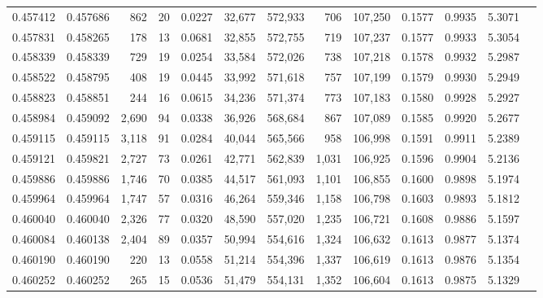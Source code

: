 \begin{tabular}{rrrrrrrrrrrrr}
0.457412 & 0.457686 &   862 &    20 &                                     0.0227 &  32,677 & 572,933 &     706 & 107,250 & 0.1577 & 0.9935 & 5.3071 \\
0.457831 & 0.458265 &   178 &    13 &                                     0.0681 &  32,855 & 572,755 &     719 & 107,237 & 0.1577 & 0.9933 & 5.3054 \\
0.458339 & 0.458339 &   729 &    19 &                                     0.0254 &  33,584 & 572,026 &     738 & 107,218 & 0.1578 & 0.9932 & 5.2987 \\
0.458522 & 0.458795 &   408 &    19 &                                     0.0445 &  33,992 & 571,618 &     757 & 107,199 & 0.1579 & 0.9930 & 5.2949 \\
0.458823 & 0.458851 &   244 &    16 &                                     0.0615 &  34,236 & 571,374 &     773 & 107,183 & 0.1580 & 0.9928 & 5.2927 \\
0.458984 & 0.459092 & 2,690 &    94 &                                     0.0338 &  36,926 & 568,684 &     867 & 107,089 & 0.1585 & 0.9920 & 5.2677 \\
0.459115 & 0.459115 & 3,118 &    91 &                                     0.0284 &  40,044 & 565,566 &     958 & 106,998 & 0.1591 & 0.9911 & 5.2389 \\
0.459121 & 0.459821 & 2,727 &    73 &                                     0.0261 &  42,771 & 562,839 &   1,031 & 106,925 & 0.1596 & 0.9904 & 5.2136 \\
0.459886 & 0.459886 & 1,746 &    70 &                                     0.0385 &  44,517 & 561,093 &   1,101 & 106,855 & 0.1600 & 0.9898 & 5.1974 \\
0.459964 & 0.459964 & 1,747 &    57 &                                     0.0316 &  46,264 & 559,346 &   1,158 & 106,798 & 0.1603 & 0.9893 & 5.1812 \\
0.460040 & 0.460040 & 2,326 &    77 &                                     0.0320 &  48,590 & 557,020 &   1,235 & 106,721 & 0.1608 & 0.9886 & 5.1597 \\
0.460084 & 0.460138 & 2,404 &    89 &                                     0.0357 &  50,994 & 554,616 &   1,324 & 106,632 & 0.1613 & 0.9877 & 5.1374 \\
0.460190 & 0.460190 &   220 &    13 &                                     0.0558 &  51,214 & 554,396 &   1,337 & 106,619 & 0.1613 & 0.9876 & 5.1354 \\
0.460252 & 0.460252 &   265 &    15 &                                     0.0536 &  51,479 & 554,131 &   1,352 & 106,604 & 0.1613 & 0.9875 & 5.1329 \\

\end{tabular}
